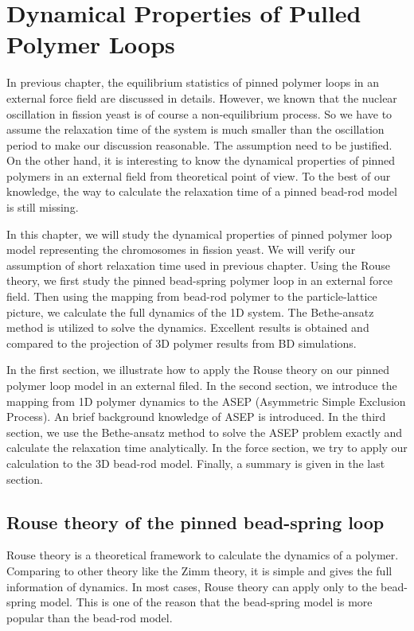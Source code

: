 \chapter{Dynamical Properties of Pulled Polymer Loops}
\graphicspath{{Chapter4/Figs/}}

In previous chapter, the equilibrium statistics of pinned polymer loops in an external force field are discussed in details. However, we known that the nuclear oscillation in fission yeast is of course a non-equilibrium process. So we have to assume the relaxation time of the system is much smaller than the oscillation period to make our discussion reasonable. The assumption need to be justified. On the other hand, it is interesting to know the dynamical properties of pinned polymers in an external field from theoretical point of view. To the best of our knowledge, the way to calculate the relaxation time of a pinned bead-rod model is still missing. 

In this chapter, we will study the dynamical properties of pinned polymer loop model representing the chromosomes in fission yeast. We will verify our assumption of short relaxation time used in previous chapter. Using the Rouse theory, we first study the pinned bead-spring polymer loop in an external force field. Then using the mapping from bead-rod polymer to the particle-lattice picture, we calculate the full dynamics of the 1D system. The Bethe-ansatz method is utilized to solve the dynamics. Excellent results is obtained and compared to the projection of 3D polymer results from BD simulations. 

In the first section, we illustrate how to apply the Rouse theory on our pinned polymer loop model in an external filed. In the second section, we introduce the mapping from 1D polymer dynamics to the ASEP (Asymmetric Simple Exclusion Process). An brief background knowledge of ASEP is introduced. In the third section, we use the Bethe-ansatz method to solve the ASEP problem exactly and calculate the relaxation time analytically. In the force section, we try to apply our calculation to the 3D bead-rod model. Finally, a summary is given in the last section. 



\section{Rouse theory of the pinned bead-spring loop}
\label{sec:rouse_theory_of_the_pinned_bead_spring_loop}
Rouse theory is a theoretical framework to calculate the dynamics of a polymer. Comparing to other theory like the Zimm theory, it is simple and gives the full information of dynamics. In most cases, Rouse theory can apply only to the bead-spring model. This is one of the reason that the bead-spring model is more popular than the bead-rod model. 

